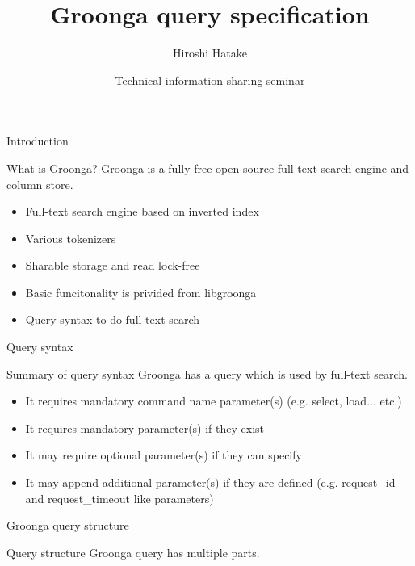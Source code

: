 \documentclass[12pt, unicode]{beamer}
\title{Groonga query specification}
\author{Hiroshi Hatake}
\date[2016/03/12]{Technical information sharing seminar}
\begin{document}
\frame{\maketitle}

\begin{frame}{Introduction}
\begin{block}{What is Groonga?}
Groonga is a fully free open-source full-text search engine and column store.
\end{block}
\begin{itemize}
\item<2-> Full-text search engine based on inverted index
\item<3-> Various tokenizers
\item<4-> Sharable storage and read lock-free
\item<5-> Basic funcitonality is privided from libgroonga
\item<6-> Query syntax to do full-text search
\end{itemize}
\end{frame}

\begin{frame}{Query syntax}
\begin{block}{Summary of query syntax}
Groonga has a query which is used by full-text search.
\end{block}
\begin{itemize}
\item<2-> It requires mandatory command name parameter(s) (e.g. select, load... etc.)
\item<3-> It requires mandatory parameter(s) if they exist
\item<4-> It may require optional parameter(s) if they can specify
\item<5-> It may append additional parameter(s) if they are defined (e.g. request\_id and request\_timeout like parameters)
\end{itemize}
\end{frame}

\begin{frame}{Groonga query structure}
\begin{block}{Query structure}
Groonga query has multiple parts.
\end{block}
\begin{table}[htb]
\end{table}
\end{frame}
\end{document}
